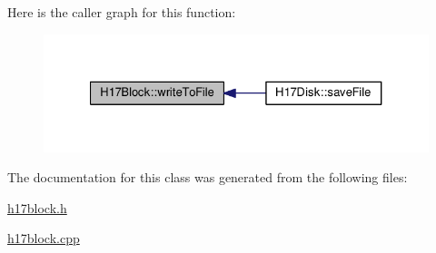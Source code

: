 Here is the caller graph for this function\+:\nopagebreak
\begin{figure}[H]
\begin{center}
\leavevmode
\includegraphics[width=327pt]{classH17Block_a59901675cd140c907fb6de4c8e0452d5_icgraph}
\end{center}
\end{figure}




The documentation for this class was generated from the following files\+:\begin{DoxyCompactItemize}
\item 
\hyperlink{h17block_8h}{h17block.\+h}\item 
\hyperlink{h17block_8cpp}{h17block.\+cpp}\end{DoxyCompactItemize}
